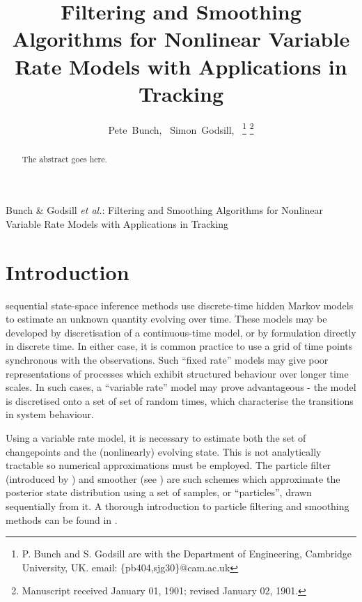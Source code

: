 \documentclass[journal]{IEEEtran}
\begin{document}
\title{Filtering and Smoothing Algorithms for Nonlinear Variable Rate Models with Applications in Tracking}

\author{Pete~Bunch,~\IEEEmembership{}
        Simon~Godsill,~%
\thanks{P. Bunch and S. Godsill are with the Department
of Engineering, Cambridge University, UK. email: \{pb404,sjg30\}@cam.ac.uk}%
\thanks{Manuscript received January 01, 1901; revised January 02, 1901.}}

%
{Bunch \& Godsill \MakeLowercase{\textit{et al.}}: Filtering and Smoothing Algorithms for Nonlinear Variable Rate Models with Applications in Tracking}

\maketitle

\begin{abstract}
The abstract goes here.
\end{abstract}

\begin{IEEEkeywords}

\end{IEEEkeywords}



\section{Introduction}

 sequential state-space inference methods use discrete-time hidden Markov models to estimate an unknown quantity evolving over time. These models may be developed by discretisation of a continuous-time model, or by formulation directly in discrete time. In either case, it is common practice to use a grid of time points synchronous with the observations. Such ``fixed rate'' models may give poor representations of processes which exhibit structured behaviour over longer time scales. In such cases, a ``variable rate'' model may prove advantageous - the model is discretised onto a set of set of random times, which characterise the transitions in system behaviour.

Using a variable rate model, it is necessary to estimate both the set of changepoints and the (nonlinearly) evolving state. This is not analytically tractable so numerical approximations must be employed. The particle filter (introduced by \cite{Gordon1993}) and smoother (see \cite{Doucet2000a,Godsill2004}) are such schemes which approximate the posterior state distribution using a set of samples, or ``particles'', drawn sequentially from it.  A thorough introduction to particle filtering and smoothing methods can be found in \cite{Cappe2007,Doucet2009}.
\end{document}
